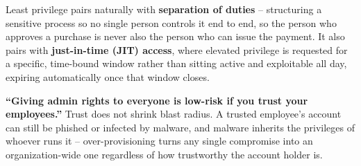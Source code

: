 Least privilege pairs naturally with \textbf{separation of duties} -- structuring a sensitive
process so no single person controls it end to end, so the person who approves a purchase is never
also the person who can issue the payment. It also pairs with \textbf{just-in-time (JIT) access},
where elevated privilege is requested for a specific, time-bound window rather than sitting active
and exploitable all day, expiring automatically once that window closes.

\begin{misconception}
\textbf{``Giving admin rights to everyone is low-risk if you trust your employees.''} Trust does not
shrink blast radius. A trusted employee's account can still be phished or infected by malware, and
malware inherits the privileges of whoever runs it -- over-provisioning turns any single compromise
into an organization-wide one regardless of how trustworthy the account holder is.
\end{misconception}

